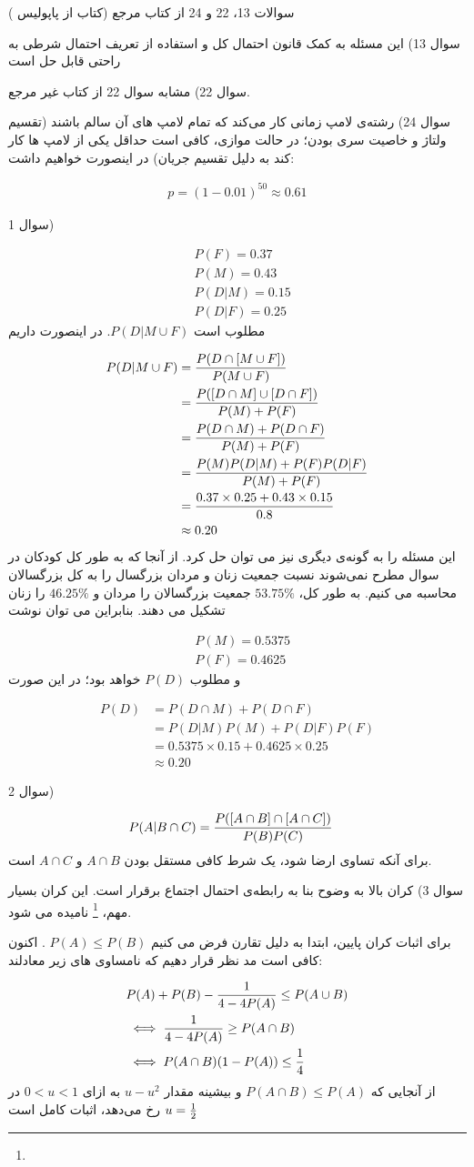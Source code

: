 \documentclass[10pt,letterpaper]{report}
\newcommand{\eqn}[1]{
\[\begin{split}
#1
\end{split}\]
}
\begin{document}
سوالات 13، 22 و 24 از کتاب مرجع (کتاب 
 از پاپولیس
)

سوال 13) این مسئله به کمک قانون احتمال کل و استفاده از تعریف احتمال شرطی به راحتی قابل حل است

سوال 22) مشابه سوال 22 از کتاب غیر مرجع.

سوال 24) رشته‌ی لامپ زمانی کار می‌کند که تمام لامپ های آن سالم باشند (تقسیم ولتاژ و خاصیت سری بودن؛ در حالت موازی، کافی است حداقل یکی از لامپ ها کار کند به دلیل تقسیم جریان) در اینصورت خواهیم داشت:
\eqn{
p=(1-0.01)^{50}\approx 0.61
}{}


سوال 1) 
\eqn{
&
P(F)=0.37
\\&
P(M)=0.43
\\&
P(D|M)=0.15
\\&
P(D|F)=0.25
}{}
مطلوب است 
$
P(D|M\cup F)
$.
 در اینصورت داریم
\eqn{
P(D|M\cup F)&=
{P(D\cap[M\cup F])\over P(M\cup F)}
\\&=
{P([D\cap M]\cup [D\cap F])\over P(M)+P(F)}
\\&=
{P(D\cap M)+P(D\cap F)\over P(M)+P(F)}
\\&=
{P(M)P(D|M)+P(F)P(D|F)\over P(M)+P(F)}
\\&=
{0.37\times 0.25+0.43\times 0.15\over 0.8}
\\&\approx 0.20
}{}
این مسئله را به گونه‌ی دیگری نیز می توان حل کرد. از آنجا که به طور کل کودکان در سوال مطرح نمی‌شوند نسبت جمعیت زنان و مردان بزرگسال را به کل بزرگسالان محاسبه می کنیم. به طور کل، 
$
53.75\%
$
 جمعیت بزرگسالان را مردان و
$
46.25\%
$
 را زنان تشکیل می دهند. بنابراین می توان نوشت
\eqn{
&
P(M)=0.5375
\\&
P(F)=0.4625
}{}
و مطلوب 
$
P(D)
$
 خواهد بود؛ در این صورت
\eqn{
P(D)&=
P(D\cap M)+P(D\cap F)
\\&=
P(D|M)P(M)+P(D|F)P(F)
\\&=
0.5375\times 0.15+0.4625\times 0.25
\\&\approx 0.20
}{}

سوال 2)
\eqn{
P(A|B\cap C)&=
{P([A\cap B]\cap [A\cap C])\over P(B)P(C)}
}{}
برای آنکه تساوی ارضا شود، یک شرط کافی مستقل بودن $A\cap B$ و $A\cap C$ است.

سوال 3) کران بالا به وضوح بنا به رابطه‌ی احتمال اجتماع برقرار است. این کران بسیار مهم، \textbf{}
\footnote{
}
 نامیده می شود.

برای اثبات کران پایین، ابتدا به دلیل تقارن فرض می کنیم 
$
P(A)\le P(B)
$
. اکنون کافی است مد نظر قرار دهیم که نامساوی های زیر معادلند:
\eqn{
&
P(A)+P(B)-{1\over 4-4P(A)}\le P(A\cup B)
\\& \iff
{1\over 4-4P(A)}\ge P(A\cap B)
\\& \iff
P(A\cap B)(1-P(A))\le {1\over 4}
}{}
از آنجایی که $
P(A\cap B)\le P(A)
$
 و بیشینه مقدار $u-u^2$ به ازای $0<u<1$ در $u={1\over 2}$ رخ می‌دهد، اثبات کامل است
\end{document}

